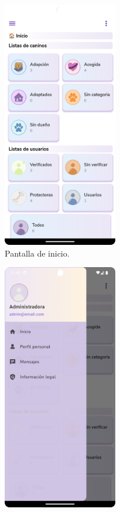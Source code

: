 \documentclass[a4paper, 12pt]{article}
\begin{document}
\begin{figure}[H]
   	\begin{subfigure}{0.48\textwidth}
		\begin{center}
			{\includegraphics[width=5cm]{app/AdminHome.png}\par}
			\caption{Pantalla de inicio.}
		\end{center}
	\end{subfigure}\hfill
   	\begin{subfigure}{0.48\textwidth}
		\begin{center}
			{\includegraphics[width=5cm]{app/AdminDrawer.png}\par}

\end{center}
\end{subfigure}
\end{figure}
\end{document}
